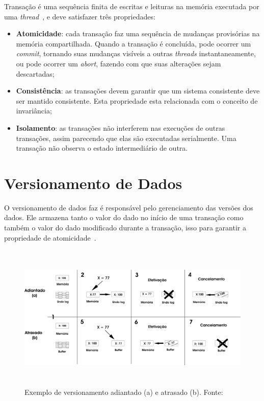 \documentclass[diss,capa]{texufpel}
\begin{document}
Transação é uma sequência finita de escritas e leituras na memória executada por uma \emph{thread}~\cite{herlihy93}, e deve satisfazer três propriedades:

\begin{itemize}
 \item \textbf{Atomicidade}: cada transação faz uma sequência de mudanças provisórias na memória compartilhada. Quando a transação é concluída, pode ocorrer um \emph{commit}, tornando suas mudanças visíveis a outras \emph{threads} instantaneamente, ou pode ocorrer um \emph{abort}, fazendo com que suas alterações sejam descartadas;

 \item \textbf{Consistência}: as transações devem garantir que um sistema consistente deve ser mantido consistente. Esta propriedade esta relacionada com o conceito de invariância;

 \item \textbf{Isolamento}: as transações não interferem nas execuções de outras transações, assim parecendo que elas são executadas serialmente. Uma transação não observa o estado intermediário de outra.
\end{itemize}

\section{Versionamento de Dados}

O versionamento de dados faz é responsável pelo gerenciamento das versões dos dados. Ele armazena tanto o valor do dado no início de uma transação como também o valor do dado modificado durante a transação, isso para garantir a propriedade de atomicidade~\cite{BaldassinTese2009}.

\begin{figure}[!htp]
\centering
\includegraphics[height=7cm]{images/versionamento.png}
\caption{Exemplo de versionamento adiantado (a) e atrasado (b). Fonte:~\cite{BaldassinTese2009}}
\label{figuraversionamento}
\end{figure}
\end{document}
